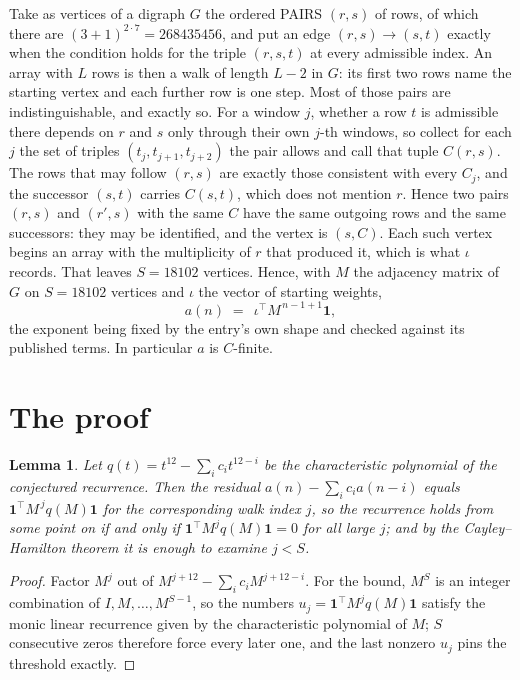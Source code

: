 \documentclass[11pt,a4paper]{article}
\theoremstyle{plain}
\newtheorem{lemma}[theorem]{Lemma}
\theoremstyle{definition}
\begin{document}
Take as vertices of a digraph $G$ the ordered PAIRS $(r,s)$ of rows, of which there are
$(3+1)^{2\cdot7}=268435456$, and put an edge $(r,s)\to(s,t)$ exactly when the condition
holds for the triple $(r,s,t)$ at every admissible index. An array with $L$ rows is then a
walk of length $L-2$ in $G$: its first two rows name the starting vertex and each further
row is one step. Most of those pairs are indistinguishable, and exactly so. For a window $j$, whether a row $t$ is admissible there depends on $r$ and $s$ only through their own $j$-th windows, so collect for each $j$ the set of triples $(t_j,t_{j+1},t_{j+2})$ the pair allows and call that tuple $C(r,s)$. The rows that may follow $(r,s)$ are exactly those consistent with every $C_j$, and the successor $(s,t)$ carries $C(s,t)$, which does not mention $r$. Hence two pairs $(r,s)$ and $(r',s)$ with the same $C$ have the same outgoing rows and the same successors: they may be identified, and the vertex is $(s,C)$. Each such vertex begins an array with the multiplicity of $r$ that produced it, which is what $\iota$ records. That leaves $S=18102$ vertices. Hence, with $M$ the adjacency matrix of $G$ on $S=18102$ vertices and
$\iota$ the vector of starting weights,
\[
a(n)\;=\;\,\iota^{\!\top}M^{\,n-1+1}\mathbf{1},
\]
the exponent being fixed by the entry's own shape and checked against its published terms.
In particular $a$ is $C$-finite.

\section{The proof}

\begin{lemma}\label{lem:crit}
Let $q(t)=t^{12}-\sum_i c_it^{12-i}$ be the characteristic polynomial of the
conjectured recurrence. Then the residual $a(n)-\sum_ic_ia(n-i)$ equals
$\mathbf{1}^{\!\top}M^{\,j}q(M)\mathbf{1}$ for the corresponding walk index
$j$, so the recurrence holds from some point on if and only if
$\mathbf{1}^{\!\top}M^{j}q(M)\mathbf{1}=0$ for all large $j$; and by the
Cayley--Hamilton theorem it is enough to examine $j<S$.
\end{lemma}

\begin{proof}
Factor $M^{j}$ out of $M^{j+12}-\sum_ic_iM^{j+12-i}$. For the bound, $M^{S}$
is an integer combination of $I,M,\dots,M^{S-1}$, so the numbers
$u_j=\mathbf{1}^{\!\top}M^{j}q(M)\mathbf{1}$ satisfy the monic linear recurrence given by
the characteristic polynomial of $M$; $S$ consecutive zeros therefore force every later one,
and the last nonzero $u_j$ pins the threshold exactly.
\end{proof}
\end{document}
